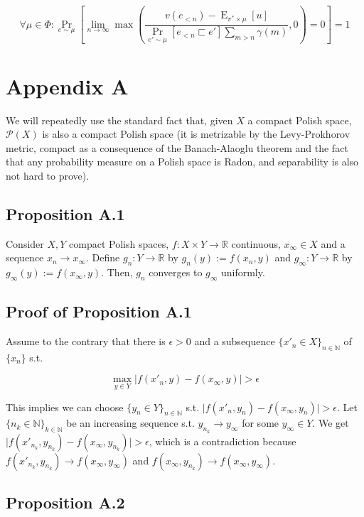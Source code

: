 \documentclass[a4paper]{article}
\DeclareMathOperator{\Prb}{Pr}
\DeclareMathOperator{\E}{E}
\newcommand{\Nats}{\mathbb{N}}
\newcommand{\Reals}{\mathbb{R}}
\newcommand{\Abs}[1]{\lvert #1 \rvert}
\newcommand{\Prob}{\mathcal{P}}
\begin{document}
$$\forall \mu \in \Phi: \Prb_{e \sim \mu}[\lim_{n \rightarrow \infty} \max(\frac{v(e_{<n})-\E_{\pi^* \times \mu}[u]}{\Prb_{e' \sim \mu}[e_{<n} \sqsubset e'] \sum_{m > n} \gamma(m)},0)=0] = 1$$

\section{Appendix A}

We will repeatedly use the standard fact that, given ${X}$ a compact Polish space, ${\Prob(X)}$ is also a compact Polish space (it is metrizable by the Levy-Prokhorov metric, compact as a consequence of the Banach-Alaoglu theorem and the fact that any probability measure on a Polish space is Radon, and separability is also not hard to prove).

\subsection{Proposition A.1}

Consider ${X, Y}$ compact Polish spaces, ${f: X \times Y \rightarrow \Reals}$ continuous, ${x_\infty \in X}$ and a sequence ${x_n \rightarrow x_\infty}$. Define ${g_n: Y \rightarrow \Reals}$ by ${g_n(y):=f(x_n,y)}$ and ${g_\infty: Y \rightarrow \Reals}$ by ${g_\infty(y):=f(x_\infty,y)}$. Then, ${g_n}$ converges to ${g_\infty}$ uniformly.

\subsection{Proof of Proposition A.1}

Assume to the contrary that there is ${\epsilon > 0}$ and a subsequence ${\{x'_n \in X\}_{n \in \Nats}}$ of ${\{x_n\}}$ s.t. 

$${\max_{y \in Y} \Abs{f(x'_n,y)-f(x_\infty,y)} > \epsilon}$$

This implies we can choose ${\{y_n \in Y\}_{n \in \Nats}}$ s.t. ${\Abs{f(x'_n,y_n)-f(x_\infty,y_n)} > \epsilon}$. Let ${\{n_k \in \Nats\}_{k \in \Nats}}$ be an increasing sequence s.t. ${y_{n_k} \rightarrow y_\infty}$ for some ${y_\infty \in Y}$. We get ${\Abs{f(x'_{n_k},y_{n_k})-f(x_\infty,y_{n_k})} > \epsilon}$, which is a contradiction because ${f(x'_{n_k},y_{n_k}) \rightarrow f(x_\infty,y_\infty)}$ and ${f(x_\infty,y_{n_k}) \rightarrow f(x_\infty,y_\infty)}$.

\subsection{Proposition A.2}
\end{document}
